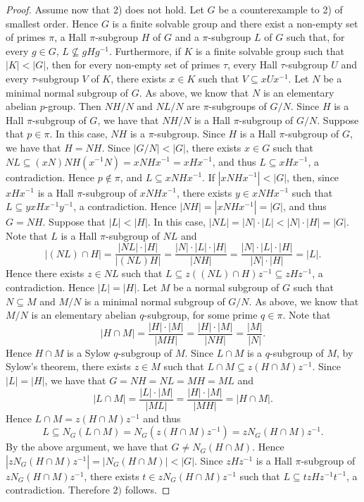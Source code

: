 \begin{proof}
    Assume now that 2) does not hold. Let $G$ be a counterexample to 2) of smallest order. Hence $G$ is a finite solvable group and there exist a non-empty set of primes $\pi$, a Hall $\pi$-subgroup $H$ of $G$ and a $\pi$-subgroup $L$ of $G$ such that, for every $g\in G$, $L\not\subseteq gHg^{-1}$. Furthermore, if $K$ is a finite solvable group such that $|K|<|G|$, then for every non-empty set of primes $\tau$, every Hall $\tau$-subgroup $U$ and every $\tau$-subgroup $V$ of $K$, there exists $x\in K$ such that $V\subseteq xUx^{-1}$. Let $N$ be a minimal normal subgroup of $G$. As above, we know that $N$ is an elementary abelian $p$-group. 
    Then $NH/N$ and $NL/N$ are $\pi$-subgroups of $G/N$.  Since $H$ is a Hall $\pi$-subgroup of $G$, we have that $NH/N$ is a Hall $\pi$-subgroup of $G/N$.
    Suppose that $p\in \pi$. In this case, $NH$ is a $\pi$-subgroup. Since $H$ is a Hall $\pi$-subgroup of $G$, we have that $H=NH$. Since $|G/N|<|G|$, there exists $x\in G$ such that $NL\subseteq (xN)NH(x^{-1}N)=xNHx^{-1}=xHx^{-1}$, and thus
    $L\subseteq xHx^{-1}$, a contradiction. Hence $p\notin \pi$, and $L\subseteq xNHx^{-1}$. If $|xNHx^{-1}|<|G|$, then, since $xHx^{-1}$ is a Hall $\pi$-subgroup of $xNHx^{-1}$, there exists $y\in xNHx^{-1}$ such that $L\subseteq yxHx^{-1}y^{-1}$, a contradiction. Hence $|NH|=|xNHx^{-1}|=|G|$, and thus $G=NH$. 
    Suppose that $|L|<|H|$. In this case, $|NL|=|N|\cdot |L|<|N|\cdot |H|=|G|$. Note that $L$ is a Hall $\pi$-subgroup of $NL$ and
    \[ |(NL)\cap H|=\frac{|NL|\cdot |H|}{|(NL)H|}=\frac{|N|\cdot |L|\cdot |H|}{|NH|}=\frac{|N|\cdot |L|\cdot |H|}{|N|\cdot |H|}=|L|.\]
    Hence there exists $z\in NL$ such that $L\subseteq z((NL)\cap H)z^{-1}\subseteq zHz^{-1}$, a contradiction. Hence $|L|=|H|$. 
    Let $M$ be a normal subgroup of $G$ such that $N\subseteq M$ and $M/N$ is a minimal normal subgroup of $G/N$. As above, we know that $M/N$ is an elementary abelian $q$-subgroup, for some prime $q\in\pi$. Note that 
    \[|H\cap M|=\frac{|H|\cdot |M|}{|MH|}=\frac{|H|\cdot |M|}{|NH|}=\frac{|M|}{|N|}.\]
    Hence $H\cap M$ is a Sylow $q$-subgroup of $M$. Since $L\cap M$ is a $q$-subgroup of $M$, by Sylow's theorem, there exists $z\in M$ such that $L\cap M\subseteq z(H\cap M)z^{-1}$. Since $|L|=|H|$, we have that $G=NH=NL=MH=ML$ and
    \[ |L\cap M|=\frac{|L|\cdot |M|}{|ML|}=\frac{|H|\cdot |M|}{|MH|}=|H\cap M|.\]
    Hence $L\cap M=z(H\cap M)z^{-1}$ and thus 
    \[ L\subseteq N_G(L\cap M)=N_G(z(H\cap M)z^{-1})=zN_G(H\cap M)z^{-1}.\]
    By the above argument, we have that $G\neq N_G(H\cap M)$. Hence $|zN_G(H\cap M)z^{-1}|=|N_G(H\cap M)|<|G|$. Since $zHz^{-1}$ is a Hall $\pi$-subgroup of $zN_G(H\cap M)z^{-1}$, there exists $t\in zN_G(H\cap M)z^{-1}$ such that $L\subseteq tzHz^{-1}t^{-1}$, a contradiction. Therefore $2)$ follows.
\end{proof}

